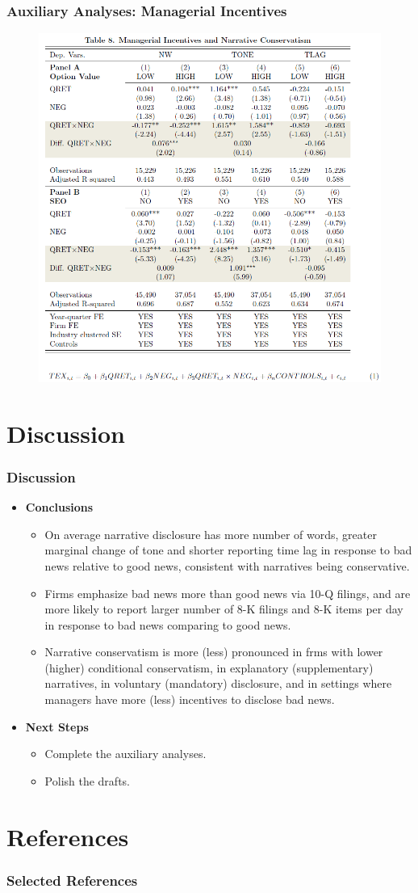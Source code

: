 \documentclass{beamer}
\begin{document}
\begin{frame}
	\frametitle{Auxiliary Analyses: Managerial Incentives}
	\begin{figure}[h]
	\centering
	\includegraphics[width=0.62\linewidth]{tab8}
	\label{tab8}
	\end{figure}
\end{frame}
\section{Discussion}
\begin{frame}
\frametitle{Discussion}
\begin{itemize}
	\item \textbf{Conclusions}
	\begin{itemize}
		\item On average narrative disclosure has more number of words, greater marginal change of tone and shorter reporting time lag in response to bad news relative to good news, consistent with narratives being conservative.
		\item Firms emphasize bad news more than good news via 10-Q filings, and are more likely to report larger number of 8-K filings and 8-K items per day in response to bad news comparing to good news.
		\item Narrative conservatism is more (less) pronounced in frms with lower (higher) conditional conservatism, in explanatory (supplementary) narratives, in voluntary (mandatory) disclosure, and in settings where managers have more (less) incentives to disclose bad news.
	\end{itemize}
	
	\item \textbf{Next Steps}
	\begin{itemize}
		\item Complete the auxiliary analyses.
		\item Polish the drafts.
	\end{itemize}
	
\end{itemize}

\end{frame}
\section{References}
\begin{frame}
\frametitle{Selected References}
\scriptsize


\end{frame}
\end{document}
